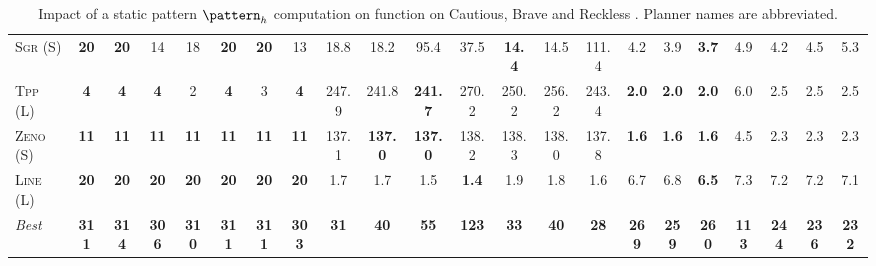 \begin{table}[tb]
{\begin{tabular}{|l||ccccccc||ccccccc||ccccccc||}
\textsc{Sgr} (S)&\textbf{20}&\textbf{20}&14&18&\textbf{20}&\textbf{20}&13&18.8&18.2&95.4&37.5&\textbf{14.4}&14.5&111.4&4.2&3.9&\textbf{3.7}&4.9&4.2&4.5&5.3\\
\textsc{Tpp} (L)&\textbf{4}&\textbf{4}&\textbf{4}&2&\textbf{4}&3&\textbf{4}&247.9&241.8&\textbf{241.7}&270.2&250.2&256.2&243.4&\textbf{2.0}&\textbf{2.0}&\textbf{2.0}&6.0&2.5&2.5&2.5\\
\textsc{Zeno} (S)&\textbf{11}&\textbf{11}&\textbf{11}&\textbf{11}&\textbf{11}&\textbf{11}&\textbf{11}&137.1&\textbf{137.0}&\textbf{137.0}&138.2&138.3&138.0&137.8&\textbf{1.6}&\textbf{1.6}&\textbf{1.6}&4.5&2.3&2.3&2.3\\
\textsc{Line} (L)&\textbf{20}&\textbf{20}&\textbf{20}&\textbf{20}&\textbf{20}&\textbf{20}&\textbf{20}&1.7&1.7&1.5&\textbf{1.4}&1.9&1.8&1.6&6.7&6.8&\textbf{6.5}&7.3&7.2&7.2&7.1
\\\hline
\textit{Best}&\textbf{311}&\textbf{314}&\textbf{306}&\textbf{310}&\textbf{311}&\textbf{311}&\textbf{303}&\textbf{31}&\textbf{40}&\textbf{55}&\textbf{123}&\textbf{33}&\textbf{40}&\textbf{28}&\textbf{269}&\textbf{259}&\textbf{260}&\textbf{113}&\textbf{244}&\textbf{236}&\textbf{232}\\\hline

        \end{tabular}}
        \caption{Impact of a static pattern $\pattern_h$ computation on function on Cautious, Brave and Reckless \pattyd. Planner names are abbreviated.}
        \label{tab:abl-patternh-static}
        \end{table}
        